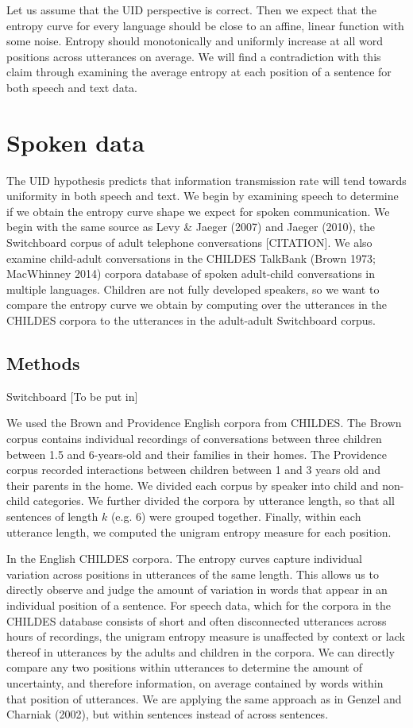 \documentclass[10pt, letterpaper]{article}
\begin{document}
Let us assume that the UID perspective is correct. Then we expect that
the entropy curve for every language should be close to an affine,
linear function with some noise. Entropy should monotonically and
uniformly increase at all word positions across utterances on average.
We will find a contradiction with this claim through examining the
average entropy at each position of a sentence for both speech and text
data.

\section{Spoken data}\label{spoken-data}

The UID hypothesis predicts that information transmission rate will tend
towards uniformity in both speech and text. We begin by examining speech
to determine if we obtain the entropy curve shape we expect for spoken
communication. We begin with the same source as Levy \& Jaeger (2007)
and Jaeger (2010), the Switchboard corpus of adult telephone
conversations {[}CITATION{]}. We also examine child-adult conversations
in the CHILDES TalkBank (Brown 1973; MacWhinney 2014) corpora database
of spoken adult-child conversations in multiple languages. Children are
not fully developed speakers, so we want to compare the entropy curve we
obtain by computing over the utterances in the CHILDES corpora to the
utterances in the adult-adult Switchboard corpus.

\subsection{Methods}\label{methods}

Switchboard {[}To be put in{]}

We used the Brown and Providence English corpora from CHILDES. The Brown
corpus contains individual recordings of conversations between three
children between 1.5 and 6-years-old and their families in their homes.
The Providence corpus recorded interactions between children between 1
and 3 years old and their parents in the home. We divided each corpus by
speaker into child and non-child categories. We further divided the
corpora by utterance length, so that all sentences of length \(k\) (e.g.
\(6\)) were grouped together. Finally, within each utterance length, we
computed the unigram entropy measure for each position.

In the English CHILDES corpora. The entropy curves capture individual
variation across positions in utterances of the same length. This allows
us to directly observe and judge the amount of variation in words that
appear in an individual position of a sentence. For speech data, which
for the corpora in the CHILDES database consists of short and often
disconnected utterances across hours of recordings, the unigram entropy
measure is unaffected by context or lack thereof in utterances by the
adults and children in the corpora. We can directly compare any two
positions within utterances to determine the amount of uncertainty, and
therefore information, on average contained by words within that
position of utterances. We are applying the same approach as in Genzel
and Charniak (2002), but within sentences instead of across sentences.
\end{document}
